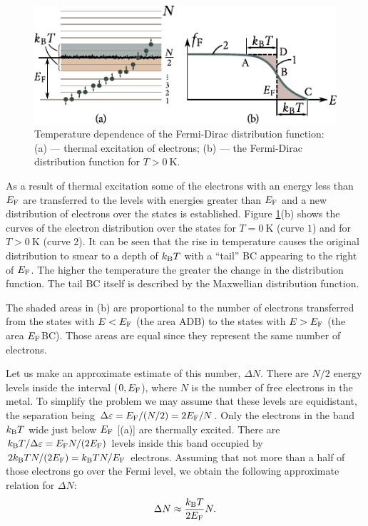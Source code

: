 \begin{figure}[t]
	\begin{center}
		\includegraphics[scale=1.1]{figures/ch_03/fig_3_6.pdf}
		\caption[]{Temperature dependence of the Fermi-Dirac distribution function: (a) --- thermal excitation of electrons; (b) --- the Fermi-Dirac distribution function for $T>\SI{0}{\kelvin}$.}
		\label{fig:3_6}
	\end{center}
	\vspace{-0.7cm}
\end{figure}

As a result of thermal excitation some of the electrons with an energy less than $E_{\text{F}}$ are transferred to the levels with energies greater than $E_{\text{F}}$ and a new distribution of electrons over the states is established. Figure \ref{fig:3_6}(b) shows the curves of the electron distribution over the states for $T=\SI{0}{\kelvin}$ (curve $1$) and for $T>\SI{0}{\kelvin}$ (curve $2$). It can be seen that the rise in temperature causes the original distribution to smear to a depth of $k_{\text{B}}T$ with a ``tail'' BC appearing to the right of $E_{\text{F}}$. The higher the temperature the greater the change in the distribution function. The tail BC itself is described by the Maxwellian distribution function.

The shaded areas in (b) are proportional to the number of electrons transferred from the states with $E<E_{\text{F}}$ (the area ADB) to the states with $E>E_{\text{F}}$ (the area $E_{\text{F}}$BC). Those areas are equal since they represent the same number of electrons.

Let us make an approximate estimate of this number, $\Delta{N}$. There are $N/2$ energy levels inside the interval ($0,E_{\text{F}}$), where $N$ is the number of free electrons in the metal. To simplify the problem we may assume that these levels are equidistant, the separation being $\Delta{\varepsilon}=E_{\text{F}}/(N/2)=2E_{\text{F}}/N$. Only the electrons in the band $k_{\text{B}}T$ wide just below $E_{\text{F}}$ [(a)] are thermally excited.
There are $k_{\text{B}}T/\Delta{\varepsilon}=E_{\text{F}}N/(2E_{\text{F}})$ levels inside this band occupied by $2k_{\text{B}}TN/(2E_{\text{F}})=k_{\text{B}}TN/E_{\text{F}}$ electrons. Assuming that not more than a half of those electrons go over the Fermi level, we obtain the following approximate relation for $\Delta{N}$:
\begin{equation}\label{eq:3_43}
    \Delta{N} \approx \frac{k_{\text{B}}T}{2 E_{\text{F}}} N.
\end{equation}

